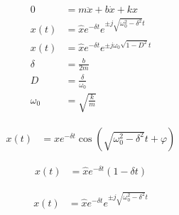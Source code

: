 \begin{boxleft}
\\
\\
\\
\\
\\
\end{boxleft}\begin{boxrightshaded}
\begin{align}
0&=m\ddot{x}+b\dot{x}+kx\\
x(t)&=\hat{x}e^{-\delta t}e^{\pm j\sqrt{\omega_0^2-\delta^2}t}\\
x(t)&=\hat{x}e^{-\delta t}e^{\pm j\omega_0\sqrt{1-D^2}t}\\
\delta&=\frac{b}{2m}\\
D&=\frac{\delta}{\omega_0}\\
\omega_0&=\sqrt{\frac{k}{m}}
\end{align}
\end{boxrightshaded}

\begin{boxleft}
\end{boxleft}\begin{boxrightshaded}
\begin{align}
x(t)&=\hat{x}e^{-\delta t}\cos(\sqrt{\omega_0^2-\delta^2}t+\varphi)
\end{align}
\end{boxrightshaded}

\begin{boxleft}
\end{boxleft}\begin{boxrightshaded}
\begin{align}
x(t)&=\hat{x}e^{-\delta t}(1-\delta t)
\end{align}
\end{boxrightshaded}

\begin{boxleft}
\end{boxleft}\begin{boxrightshaded}
\begin{align}
x(t)&=\hat{x}e^{-\delta t}e^{\pm j\sqrt{\omega_0^2-\delta^2}t}
\end{align}
\end{boxrightshaded}